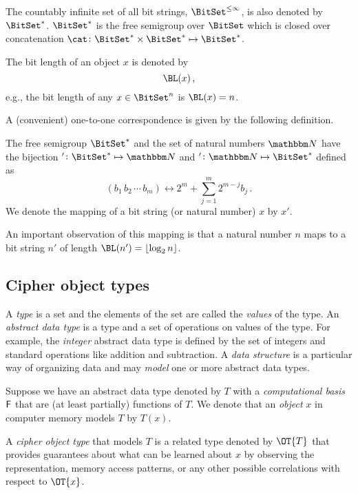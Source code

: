 \documentclass[ ../main.tex]{subfiles}
\begin{document}
The countably infinite set of all bit strings, $\BitSet^{\leq \infty}$, is also denoted by $\BitSet^*$.
$\BitSet^*$ is the free semigroup over $\BitSet$ which is closed over concatenation $\cat \colon {\BitSet^*} \times {\BitSet^*} \mapsto {\BitSet^*}$.


The bit length of an object $x$ is denoted by
\begin{equation}
\BL(x)\,,
\end{equation}
e.g., the bit length of any $x \in \BitSet^n$ is $\BL(x) = n$.

A (convenient) one-to-one correspondence is given by the following definition.
\begin{definition}
\label{def:mapping}
The free semigroup $\BitSet^{*}$ and the set of natural numbers $\NatSet$ have the bijection $' \colon \BitSet^* \mapsto \NatSet$ and $' \colon \NatSet \mapsto \BitSet^*$ defined as
\begin{equation}
	(b_1 \, b_2 \, \cdots \, b_m) \longleftrightarrow 2^m + \sum_{j=1}^{m} 2^{m - j} b_j\,.
\end{equation}
We denote the mapping of a bit string (or natural number) $x$ by $x'$.
\end{definition}
An important observation of this mapping is that a natural number $n$ maps to a bit string $n'$ of length $\BL(n') = \lfloor \log_2 n \rfloor$.

\subsection{Cipher object types}
A \emph{type} is a set and the elements of the set are called the \emph{values} of the type.
An \emph{abstract data type} is a type and a set of operations on values of the type.
For example, the \emph{integer} abstract data type is defined by the set of integers and standard operations like addition and subtraction.
A \emph{data structure} is a particular way of organizing data and may \emph{model} one or more abstract data types.

Suppose we have an abstract data type denoted by $T$ with a \emph{computational basis} $\Set{F}$ that are (at least partially) functions of $T$.
We denote that an \emph{object} $x$ in computer memory models $T$ by $T(x)$.

A \emph{cipher object type}\cite{obtype} that models $T$ is a related type denoted by $\OT{T}$ that provides guarantees about what can be learned about $x$ by observing the representation, memory access patterns, or any other possible correlations with respect to $\OT{x}$.
\end{document}
